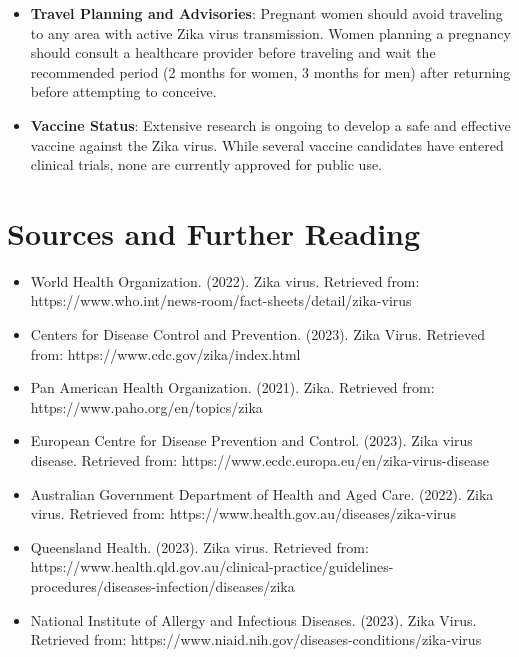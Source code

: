 \begin{itemize}
\begin{itemize}
  \end{itemize}
\item \textbf{Travel Planning and Advisories}: Pregnant women should avoid traveling to any area with active Zika virus transmission. Women planning a pregnancy should consult a healthcare provider before traveling and wait the recommended period (2 months for women, 3 months for men) after returning before attempting to conceive.
\item \textbf{Vaccine Status}: Extensive research is ongoing to develop a safe and effective vaccine against the Zika virus. While several vaccine candidates have entered clinical trials, none are currently approved for public use.
\end{itemize}

\section*{Sources and Further Reading}
\begin{itemize}
\item World Health Organization. (2022). Zika virus. Retrieved from: https://www.who.int/news-room/fact-sheets/detail/zika-virus
\item Centers for Disease Control and Prevention. (2023). Zika Virus. Retrieved from: https://www.cdc.gov/zika/index.html
\item Pan American Health Organization. (2021). Zika. Retrieved from: https://www.paho.org/en/topics/zika
\item European Centre for Disease Prevention and Control. (2023). Zika virus disease. Retrieved from: https://www.ecdc.europa.eu/en/zika-virus-disease
\item Australian Government Department of Health and Aged Care. (2022). Zika virus. Retrieved from: https://www.health.gov.au/diseases/zika-virus
\item Queensland Health. (2023). Zika virus. Retrieved from: https://www.health.qld.gov.au/clinical-practice/guidelines-procedures/diseases-infection/diseases/zika
\item National Institute of Allergy and Infectious Diseases. (2023). Zika Virus. Retrieved from: https://www.niaid.nih.gov/diseases-conditions/zika-virus
\end{itemize}